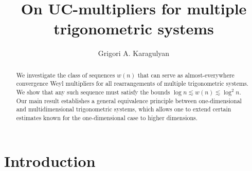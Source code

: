 \documentclass[12pt,reqno,fleqn]{amsart}
\title[On UC-multipliers for multiple trigonometric systems] {On UC-multipliers for multiple trigonometric systems }
\author{Grigori A. Karagulyan}
\theoremstyle{plain} %
\theoremstyle{remark}
\theoremstyle{plain}
\numberwithin{equation}{section}
\begin{document}
	\maketitle
	\begin{abstract}
		We investigate the class of sequences $w(n)$ that can serve as almost-everywhere convergence Weyl multipliers for all rearrangements of multiple trigonometric systems. We show that any such sequence must satisfy the bounds $\log n\lesssim w(n)\lesssim\log^2 n$. Our main result establishes a general equivalence principle between one-dimensional and multidimensional trigonometric systems, which allows one to extend certain estimates known for the one-dimensional case to higher dimensions.
	\end{abstract}

\section{Introduction}
\end{document}
